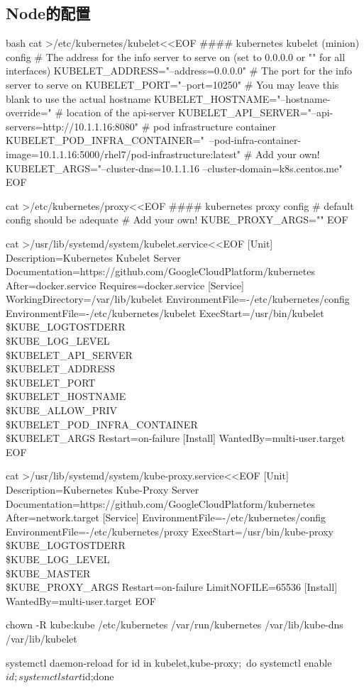 \subsection{Node的配置}
\begin{code-block}{bash}
cat >/etc/kubernetes/kubelet<<EOF
#### kubernetes kubelet (minion) config
# The address for the info server to serve on (set to 0.0.0.0 or "" for all interfaces)
KUBELET_ADDRESS="--address=0.0.0.0"
# The port for the info server to serve on
KUBELET_PORT="--port=10250"
# You may leave this blank to use the actual hostname
KUBELET_HOSTNAME="--hostname-override="
# location of the api-server
KUBELET_API_SERVER="--api-servers=http://10.1.1.16:8080"
# pod infrastructure container
KUBELET_POD_INFRA_CONTAINER="\
    --pod-infra-container-image=10.1.1.16:5000/rhel7/pod-infrastructure:latest"
# Add your own!
KUBELET_ARGS="--cluster-dns=10.1.1.16 --cluster-domain=k8s.centos.me"
EOF

cat >/etc/kubernetes/proxy<<EOF
#### kubernetes proxy config
# default config should be adequate
# Add your own!
KUBE_PROXY_ARGS=""
EOF

cat >/usr/lib/systemd/system/kubelet.service<<EOF
[Unit]
Description=Kubernetes Kubelet Server
Documentation=https://github.com/GoogleCloudPlatform/kubernetes
After=docker.service
Requires=docker.service
[Service]
WorkingDirectory=/var/lib/kubelet
EnvironmentFile=-/etc/kubernetes/config
EnvironmentFile=-/etc/kubernetes/kubelet
ExecStart=/usr/bin/kubelet \\
            \$KUBE_LOGTOSTDERR \\
            \$KUBE_LOG_LEVEL \\
            \$KUBELET_API_SERVER \\
            \$KUBELET_ADDRESS \\
            \$KUBELET_PORT \\
            \$KUBELET_HOSTNAME \\
            \$KUBE_ALLOW_PRIV \\
            \$KUBELET_POD_INFRA_CONTAINER \\
            \$KUBELET_ARGS
Restart=on-failure
[Install]
WantedBy=multi-user.target
EOF

cat >/usr/lib/systemd/system/kube-proxy.service<<EOF
[Unit]
Description=Kubernetes Kube-Proxy Server
Documentation=https://github.com/GoogleCloudPlatform/kubernetes
After=network.target
[Service]
EnvironmentFile=-/etc/kubernetes/config
EnvironmentFile=-/etc/kubernetes/proxy
ExecStart=/usr/bin/kube-proxy \\
            \$KUBE_LOGTOSTDERR \\
            \$KUBE_LOG_LEVEL \\
            \$KUBE_MASTER \\
            \$KUBE_PROXY_ARGS
Restart=on-failure
LimitNOFILE=65536
[Install]
WantedBy=multi-user.target
EOF

chown -R kube:kube /etc/kubernetes /var/run/kubernetes /var/lib/kube-dns /var/lib/kubelet

systemctl daemon-reload
for id in {kubelet,kube-proxy};\
    do systemctl enable $id;systemctl start $id;done
\end{code-block}

